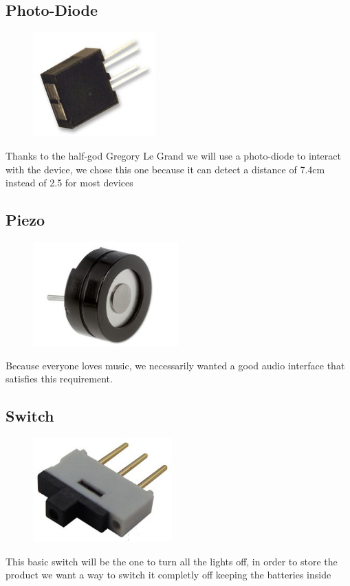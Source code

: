 \documentclass[12pt,a4paper,landscape]{article}
\begin{document}
\begin{multicols}{2}
			\vspace{4cm}

	\subsection*{Photo-Diode}
			\begin{figure}[H]
			\centering
			\includegraphics[height=4cm]{images/photo-diode.png}
			\end{figure}
			Thanks to the half-god Gregory Le Grand we will use a photo-diode to interact with the device, we chose this one because it can detect a distance of 7.4cm instead of 2.5 for most devices

	\subsection*{Piezo}
			\begin{figure}[H]
			\centering
			\includegraphics[height=4cm]{images/piezo.png}
			\end{figure}
			Because everyone loves music, we necessarily wanted a good audio interface that satisfies this requirement.

	\subsection*{Switch}
			\begin{figure}[H]
			\centering
			\includegraphics[height=4cm]{images/switch.png}
			\end{figure}
			This basic switch will be the one to turn all the lights off, in order to store the product we want a way to switch it completly off keeping the batteries inside


\end{multicols}
\end{document}
